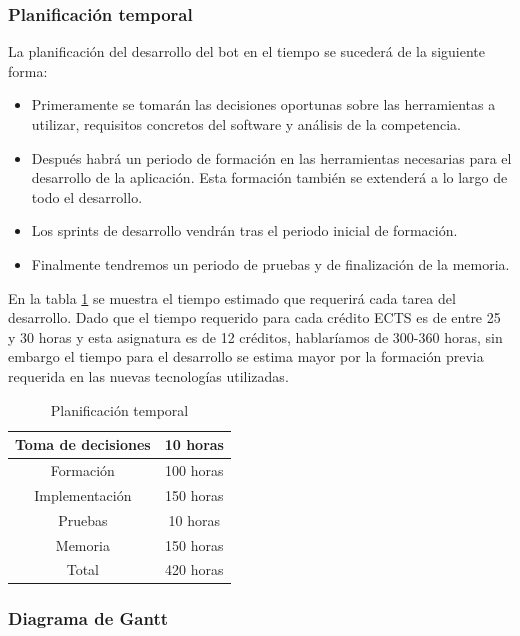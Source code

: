 \subsubsection{Planificación temporal}

La planificación del desarrollo del bot en el tiempo se sucederá de la siguiente forma:

\begin{itemize}
    \item Primeramente se tomarán las decisiones oportunas sobre las herramientas a utilizar, requisitos concretos del software y análisis de la competencia.
    \item Después habrá un periodo de formación en las herramientas necesarias para el desarrollo de la aplicación. Esta formación también se extenderá a lo largo de todo el desarrollo.
    \item Los sprints de desarrollo vendrán tras el periodo inicial de formación.
    \item Finalmente tendremos un periodo de pruebas y de finalización de la memoria.
\end{itemize}

En la tabla \ref{tab:planificacionTemporal} se muestra el tiempo estimado que requerirá cada tarea del desarrollo. Dado que el tiempo requerido para cada crédito ECTS es de entre 25 y 30 horas y esta asignatura es de 12 créditos, hablaríamos de 300-360 horas, sin embargo el tiempo para el desarrollo se estima mayor por la formación previa requerida en las nuevas tecnologías utilizadas.

\begin{table}[]
    \centering
    \begin{tabular}{|c|c|}
        \hline
        Toma de decisiones & 10 horas \\
        \hline
        Formación   & 100 horas \\
        \hline
        Implementación & 150 horas \\
        \hline
        Pruebas & 10 horas \\
        \hline
        Memoria & 150 horas \\
        \hline
        \hline
        Total & 420 horas \\
        \hline
    \end{tabular}
    \caption{Planificación temporal}
    \label{tab:planificacionTemporal}
\end{table}


\subsubsection{Diagrama de Gantt}

